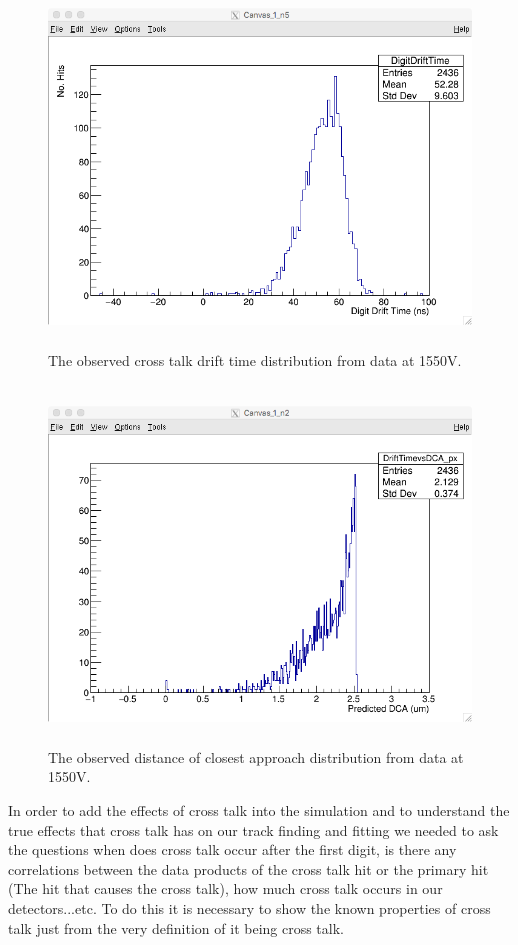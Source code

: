 \documentclass[./Thesis]{subfiles}
\begin{document}
\begin{figure}
	\centerline{\includegraphics[height=95mm]{DriftTimeXtalk.png}}
	\caption[ DriftTime Distribution of Cross Talk]{ The observed cross talk drift time distribution from data at 1550V.}
	\label{fig:DriftXtalk}
\end{figure}
	
\begin{figure}
	\centerline{\includegraphics[height=95mm]{DCAXtalk.png}}
	\caption[ Distance of Closest Approach Distribution of Cross Talk]{ The observed distance of closest approach distribution from data at 1550V.}
	\label{fig:DCAXtalk}
\end{figure}
	
	In order to add the effects of cross talk into the simulation and to understand the true effects that cross talk has on our track finding and fitting we needed to ask the questions when does cross talk occur after the first digit, is there any correlations between the data products of the cross talk hit or the primary hit (The hit that causes the cross talk), how much cross talk occurs in our detectors...etc. To do this it is necessary to show the known properties of cross talk just from the very definition of it being cross talk. 
\end{document}
